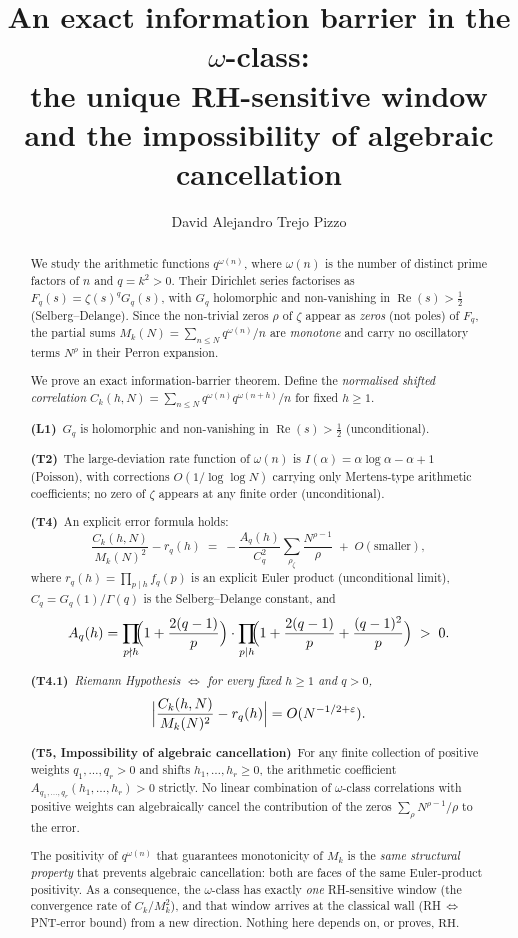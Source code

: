 \documentclass[11pt]{amsart}
\title[An $\omega$-Class Information Barrier]{An exact information barrier in the $\omega$-class:\\
the unique RH-sensitive window and the impossibility of algebraic cancellation}
\author{David Alejandro Trejo Pizzo}
\theoremstyle{definition}
\theoremstyle{remark}
\newcommand{\RH}{\mathrm{RH}}
\renewcommand{\Re}{\operatorname{Re}}
\newcommand{\half}{\tfrac12}
\newcommand{\om}{\omega}
\begin{document}
\begin{abstract}
We study the arithmetic functions $q^{\om(n)}$, where $\om(n)$ is the number of distinct
prime factors of $n$ and $q = k^2 > 0$.  Their Dirichlet series factorises as
$F_q(s) = \zeta(s)^q G_q(s)$, with $G_q$ holomorphic and non-vanishing in
$\Re(s) > \tfrac12$ (Selberg--Delange).  Since the non-trivial zeros $\rho$ of $\zeta$
appear as \emph{zeros} (not poles) of $F_q$, the partial sums
$M_k(N) = \sum_{n\le N} q^{\om(n)}/n$ are \emph{monotone} and carry no oscillatory
terms $N^\rho$ in their Perron expansion.

We prove an exact information-barrier theorem.  Define the \emph{normalised shifted
correlation} $C_k(h,N) = \sum_{n\le N} q^{\om(n)}q^{\om(n+h)}/n$ for fixed $h\ge 1$.

\noindent\textbf{(L1)}\ $G_q$ is holomorphic and non-vanishing in $\Re(s)>\half$
(unconditional).

\noindent\textbf{(T2)}\ The large-deviation rate function of $\om(n)$ is
$I(\alpha) = \alpha\log\alpha - \alpha + 1$ (Poisson), with corrections $O(1/\log\log N)$
carrying only Mertens-type arithmetic coefficients; no zero of $\zeta$ appears at any
finite order (unconditional).

\noindent\textbf{(T4)}\ An explicit error formula holds:
\[
  \frac{C_k(h,N)}{M_k(N)^2} - r_q(h) \;=\;
  -\frac{A_q(h)}{C_q^2}\sum_{\rho_\zeta}\frac{N^{\rho-1}}{\rho}
  \;+\; O(\text{smaller}),
\]
where $r_q(h) = \prod_{p\mid h} f_q(p)$ is an explicit Euler product (unconditional limit),
$C_q = G_q(1)/\Gamma(q)$ is the Selberg--Delange constant, and
\[
  A_q(h) = \prod_{p\nmid h}\!\!\Bigl(1+\frac{2(q-1)}{p}\Bigr)
            \cdot\prod_{p\mid h}\!\!\Bigl(1+\frac{2(q-1)}{p}+\frac{(q-1)^2}{p}\Bigr)
  \;>\;0.
\]

\noindent\textbf{(T4.1)}\ \emph{Riemann Hypothesis $\Longleftrightarrow$ for every fixed
$h\ge 1$ and $q>0$,}
\[
  \Bigl|\frac{C_k(h,N)}{M_k(N)^2} - r_q(h)\Bigr| = O(N^{-1/2+\varepsilon}).
\]

\noindent\textbf{(T5, Impossibility of algebraic cancellation)}\ For any finite collection
of positive weights $q_1,\ldots,q_r > 0$ and shifts $h_1,\ldots,h_r \ge 0$, the
arithmetic coefficient $A_{q_1,\ldots,q_r}(h_1,\ldots,h_r)>0$ strictly.  No linear
combination of $\om$-class correlations with positive weights can algebraically
cancel the contribution of the zeros $\sum_\rho N^{\rho-1}/\rho$ to the error.

The positivity of $q^{\om(n)}$ that guarantees monotonicity of $M_k$ is the
\emph{same structural property} that prevents algebraic cancellation: both are faces of
the same Euler-product positivity.  As a consequence, the $\omega$-class has exactly
\emph{one} RH-sensitive window (the convergence rate of $C_k/M_k^2$), and that window
arrives at the classical wall (RH\,$\Leftrightarrow$\,PNT-error bound) from a new
direction.  Nothing here depends on, or proves, $\RH$.
\end{abstract}
\maketitle
\end{document}
